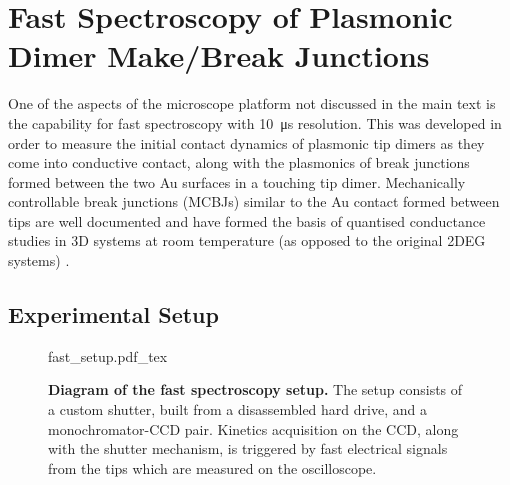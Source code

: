 \documentclass[12pt, a4paper, twoside]{book}
\begin{document}
\chapter{Fast Spectroscopy of Plasmonic Dimer Make/Break Junctions}

One of the aspects of the microscope platform not discussed in the main text is the capability for fast spectroscopy with \SI{10}{\micro\second} resolution. This was developed in order to measure the initial contact dynamics of plasmonic tip dimers as they come into conductive contact, along with the plasmonics of  break junctions formed between the two Au surfaces in a touching tip dimer. Mechanically controllable break junctions (MCBJs) similar to the Au contact formed between tips are well documented and have formed the basis of quantised conductance studies in 3D systems at room temperature (as opposed to the original 2DEG systems) \cite{armstrong2010channel, costa1997conductance, costa1997conductance2, costa1997conductance3, landman1996reversible, natelson2012mechanical, rodrigues2000signature, rodrigues2002quantum, sabater2012mechanical, sorensen1998mechanical, yanson2005atomic}.

\FloatBarrier
\section{Experimental Setup}

\begin{figure}[bt]
\centering
\fontsize{11pt}{1em}\selectfont
{fast_setup.pdf_tex}
\caption[Diagram of the fast spectroscopy setup]{\textbf{Diagram of the fast spectroscopy setup.} The setup consists of a custom shutter, built from a disassembled hard drive, and a monochromator-CCD pair. Kinetics acquisition on the CCD, along with the shutter mechanism, is triggered by fast electrical signals from the tips which are measured on the oscilloscope.}
\label{fig:fast_setup}
\end{figure}
\end{document}
